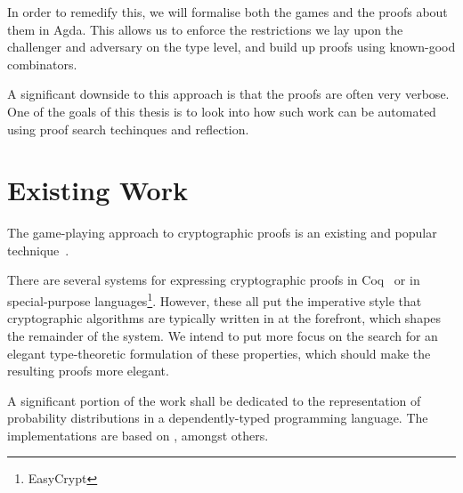 In order to remedify this, we will formalise both the games and the proofs about them in Agda.  This allows us to
enforce the restrictions we lay upon the challenger and adversary on the type level, and build up proofs using
known-good combinators.

A significant downside to this approach is that the proofs are often very verbose.  One of the goals of this thesis is
to look into how such work can be automated using proof search techinques and reflection.

\section{Existing Work}

The game-playing approach to cryptographic proofs is an existing and popular technique~\cite{codebasedgames}.

There are several systems for expressing cryptographic proofs in Coq~\cite{fcf} or in special-purpose
languages\footnote{EasyCrypt}.  However, these all put the imperative style that cryptographic algorithms are typically
written in at the forefront, which shapes the remainder of the system.  We intend to put more focus on the search for an
elegant type-theoretic formulation of these properties, which should make the resulting proofs more elegant.

A significant portion of the work shall be dedicated to the representation of probability distributions in a
dependently-typed programming language.  The implementations are based on \cite{stochasticlambdacalculus}, amongst
others.
